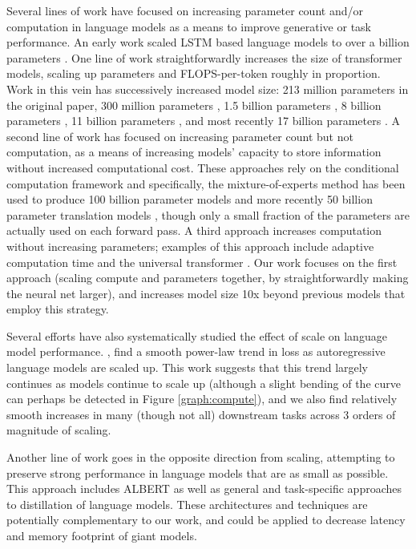 Several lines of work have focused on increasing parameter count and/or computation in language models as a means to improve generative or task performance. An early work scaled LSTM based language models to over a billion parameters \cite{jozefowicz2016exploring}. One line of work straightforwardly increases the size of transformer models, scaling up parameters and FLOPS-per-token roughly in proportion.  Work in this vein has successively increased model size: 213 million parameters \cite{vaswani2017attention} in the original paper, 300 million parameters \cite{devlin2018bert}, 1.5 billion parameters \cite{radford2019language}, 8 billion parameters  \cite{shoeybi2019megatronlm}, 11 billion parameters \cite{raffel2019t5}, and most recently 17 billion parameters \cite{turing_17m}.  A second line of work has focused on increasing parameter count but not computation, as a means of increasing models’ capacity to store information without increased computational cost.  These approaches rely on the conditional computation framework \cite{bengio2013cond} and specifically, the mixture-of-experts method \cite{shazeer2017outrageously} has been used to produce 100 billion parameter models and more recently 50 billion parameter translation models \cite{aharoni201950B}, though only a small fraction of the parameters are actually used on each forward pass. A third approach increases computation without increasing parameters; examples of this approach include adaptive computation time \cite{graves2016act} and  the universal transformer \cite{dehghani2018ut}. Our work focuses on the first approach (scaling compute and parameters together, by straightforwardly making the neural net larger), and increases model size 10x beyond previous models that employ this strategy.

Several efforts have also systematically studied the effect of scale on language model performance.  \cite{kaplan2020scaling,rosenfeld2019constructive,li2020train,hestness2017deep}, find a smooth power-law trend in loss as autoregressive language models are scaled up.  This work suggests that this trend largely continues as models continue to scale up (although a slight bending of the curve can perhaps be detected in Figure \ref{graph:compute}), and we also find relatively smooth increases in many (though not all) downstream tasks across 3 orders of magnitude of scaling.

Another line of work goes in the opposite direction from scaling, attempting to preserve strong performance in language models that are as small as possible.  This approach includes ALBERT \cite{lan2019albert} as well as general \cite{hinton2015distilling} and task-specific \cite{sanh2019distilbert,jiao2019tinybert,yoon2016sequencedistil} approaches to distillation of language models.  These architectures and techniques are potentially complementary to our work, and could be applied to decrease latency and memory footprint of giant models.

